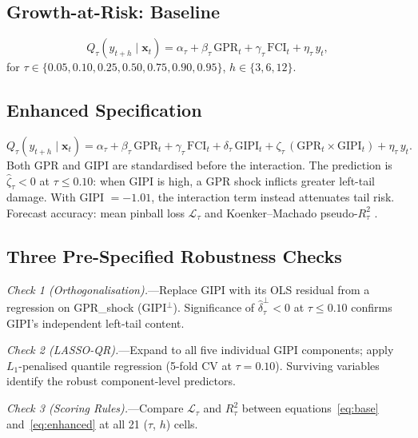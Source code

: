 \documentclass[12pt]{article}
\begin{document}
\subsection{Growth-at-Risk: Baseline}

\begin{equation}
Q_\tau(y_{t+h} \mid \mathbf{x}_t)
= \alpha_\tau + \beta_\tau\,\text{GPR}_t
+ \gamma_\tau\,\text{FCI}_t + \eta_\tau\,y_t,
\label{eq:base}
\end{equation}
for $\tau \in \{0.05, 0.10, 0.25, 0.50, 0.75, 0.90, 0.95\}$,
$h \in \{3, 6, 12\}$.

\subsection{Enhanced Specification}

\begin{equation}
Q_\tau(y_{t+h} \mid \mathbf{x}_t)
= \alpha_\tau + \beta_\tau\,\text{GPR}_t + \gamma_\tau\,\text{FCI}_t
+ \delta_\tau\,\text{GIPI}_t
+ \zeta_\tau\,(\text{GPR}_t \times \text{GIPI}_t)
+ \eta_\tau\,y_t.
\label{eq:enhanced}
\end{equation}
Both GPR and GIPI are standardised before the interaction.
The prediction is $\hat{\zeta}_\tau < 0$ at $\tau \leq 0.10$:
when GIPI is high, a GPR shock inflicts greater left-tail damage.
With GIPI $= -1.01$, the interaction term instead attenuates tail risk.
Forecast accuracy: mean pinball loss $\mathcal{L}_\tau$ and
Koenker--Machado pseudo-$R^2_\tau$ \citep{koenker1978,koenker1999}.

\subsection{Three Pre-Specified Robustness Checks}

\textit{Check 1 (Orthogonalisation).}---Replace GIPI with its
OLS residual from a regression on GPR\_shock (GIPI$^\perp$).
Significance of $\hat{\delta}^\perp_\tau < 0$ at $\tau \leq 0.10$
confirms GIPI's independent left-tail content.

\textit{Check 2 (LASSO-QR).}---Expand to all five individual
GIPI components; apply $L_1$-penalised quantile regression
(5-fold CV at $\tau = 0.10$).
Surviving variables identify the robust component-level predictors.

\textit{Check 3 (Scoring Rules).}---Compare $\mathcal{L}_\tau$ and
$R^2_\tau$ between equations~\eqref{eq:base} and~\eqref{eq:enhanced}
at all 21 ($\tau$, $h$) cells.
\end{document}
